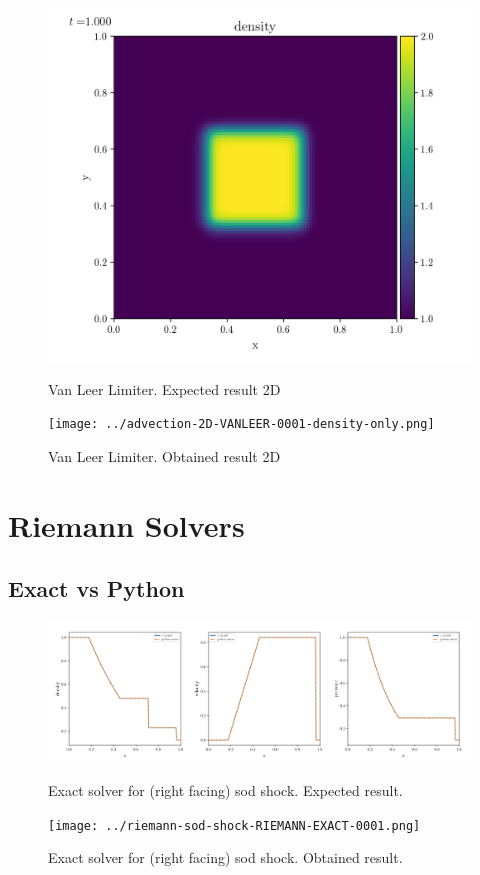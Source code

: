 \begin{figure}[htbp]
    \centering
	\includegraphics[width=.7\textwidth]{./figures/advection-2D-VANLEER-0001-density-only.png}%
	\caption{Van Leer Limiter. Expected result 2D}
	\texttt{[image: ../advection-2D-VANLEER-0001-density-only.png]}%
	\caption{Van Leer Limiter. Obtained result 2D}
\end{figure}













\clearpage
\section{Riemann Solvers}
\subsection{Exact vs Python}


\begin{figure}[htbp]
    \centering
	\includegraphics[width=.9\textwidth]{./figures/riemann-sod-shock-RIEMANN-EXACT-overplotted.png}%
	\caption{Exact solver for (right facing) sod shock. Expected result.}
	\texttt{[image: ../riemann-sod-shock-RIEMANN-EXACT-0001.png]}%
	\caption{Exact solver for (right facing) sod shock. Obtained result.}
\end{figure}


